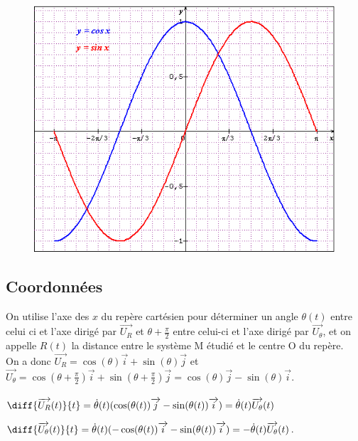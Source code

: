\documentclass[a4paper,10pt]{book} %
\begin{document}
\begin{figure} \includegraphics[scale=0.5]{images/001.png} \end{figure}

\subsection{Coordonnées}

On utilise l'axe des $x$ du repère cartésien pour déterminer un angle $\theta(t)$ entre celui ci et l'axe dirigé par $\overrightarrow{U_R}$ et $\theta+\frac{\pi}{2}$ entre celui-ci et l'axe dirigé par $\overrightarrow{U_\theta}$, et on appelle $R(t)$ la distance entre le système M étudié et le centre O du repère. \\

On a donc $\overrightarrow{U_R}=\cos(\theta)\overrightarrow{i}+\sin(\theta)\overrightarrow{j}$ et\\
$\overrightarrow{U_\theta}=\cos(\theta+\frac{\pi}{2})\overrightarrow{i}+\sin(\theta+\frac{\pi}{2})\overrightarrow{j}= \cos(\theta)\overrightarrow{j}-\sin(\theta)\overrightarrow{i}$.\\\\

$\diff{\overrightarrow{U_R}(t)}{t}=\dot{\theta}(t)(\cos(\theta(t))\overrightarrow{j}-\sin(\theta(t))\overrightarrow{i})=\dot{\theta}(t)\overrightarrow{U_\theta}(t)$

$\diff{\overrightarrow{U_\theta}(t)}{t}=\dot{\theta}(t)(-\cos(\theta(t))\overrightarrow{i}-\sin(\theta(t))\overrightarrow{i})=-\dot{\theta}(t)\overrightarrow{U_\theta}(t)$.
\end{document}
